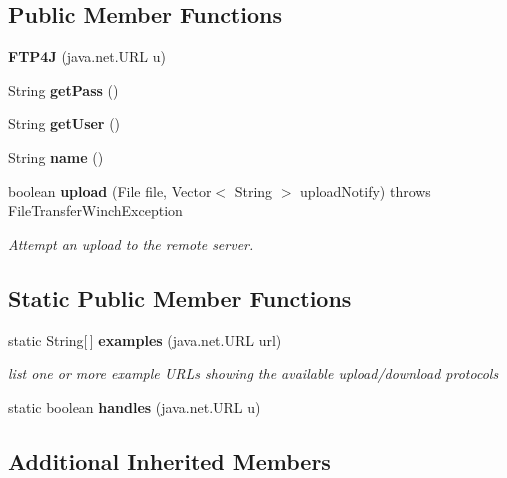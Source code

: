 \subsection*{Public Member Functions}
\begin{DoxyCompactItemize}
\item 
{\bfseries F\+T\+P4\+J} (java.\+net.\+U\+R\+L u)\label{classorg_1_1smallfoot_1_1filexfer_1_1FTP4J_ad5bd367701ec46e8d0ba3f0ae3d83cae}

\item 
String {\bfseries get\+Pass} ()\label{classorg_1_1smallfoot_1_1filexfer_1_1FTP4J_a6cba30c67b9a7c8d4750e7e3108961c6}

\item 
String {\bfseries get\+User} ()\label{classorg_1_1smallfoot_1_1filexfer_1_1FTP4J_af8214ba89d8ad71194a2d69bea5cb808}

\item 
String {\bfseries name} ()\label{classorg_1_1smallfoot_1_1filexfer_1_1FTP4J_afa2149aced9d90555f788dfc81c23d15}

\item 
boolean {\bf upload} (File file, Vector$<$ String $>$ upload\+Notify)  throws File\+Transfer\+Winch\+Exception     
\begin{DoxyCompactList}\small\item\em Attempt an upload to the remote server. \end{DoxyCompactList}\end{DoxyCompactItemize}
\subsection*{Static Public Member Functions}
\begin{DoxyCompactItemize}
\item 
static String[$\,$] {\bf examples} (java.\+net.\+U\+R\+L url)
\begin{DoxyCompactList}\small\item\em list one or more example U\+R\+Ls showing the available upload/download protocols \end{DoxyCompactList}\item 
static boolean {\bfseries handles} (java.\+net.\+U\+R\+L u)\label{classorg_1_1smallfoot_1_1filexfer_1_1FTP4J_a4ef8d35ab128080eb511f7e26cd7ab7b}

\end{DoxyCompactItemize}
\subsection*{Additional Inherited Members}


